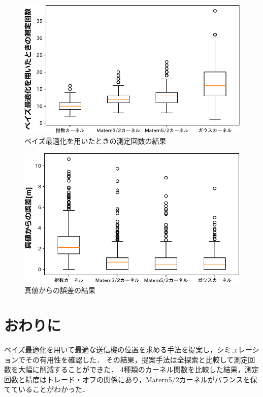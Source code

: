 \documentclass[twocolumn]{ltjarticle}
\begin{document}
\setlength\intextsep{3pt}
\setlength\textfloatsep{3pt}
\begin{figure}[H]
	\centering
	\includegraphics[width=0.83\linewidth]{./figures/material_8_count_box.pdf}
	\vspace*{-0.4cm}
	\caption{ベイズ最適化を用いたときの測定回数の結果} \label{fig:result_count}
\end{figure}
\vspace*{-0.1cm}
\begin{figure}[H]
	\centering
	\includegraphics[width=0.83\linewidth]{./figures/material_8_distance_box.pdf}
	\vspace*{-0.4cm}
	\caption{真値からの誤差の結果} \label{fig:result_error}
\end{figure}

\section{おわりに}

ベイズ最適化を用いて最適な送信機の位置を求める手法を提案し，シミュレーションでその有用性を確認した．
その結果，提案手法は全探索と比較して測定回数を大幅に削減することができた．
4種類のカーネル関数を比較した結果，測定回数と精度はトレード・オフの関係にあり，Matern5/2カーネルがバランスを保てていることがわかった．
\printbibliography[title=参考文献]
\end{document}
